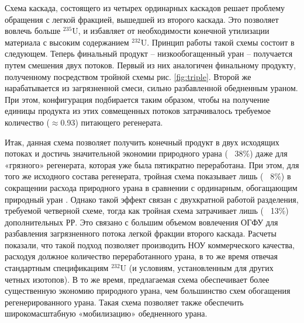 Схема каскада, состоящего из четырех ординарных каскадов решает проблему обращения с легкой фракцией, вышедшей из второго каскада.
Это позволяет вовлечь больше $^{235}$U, и избавляет от необходимости конечной утилизации материала с высоким содержанием $^{232}$U.
Принцип работы такой схемы состоит в следующем.
Теперь финальный продукт -- низкообогащенный уран -- получается путем смешения двух потоков.
Первый из них аналогичен финальному продукту, полученному посредством тройной схемы рис. \ref{fig:triple}.
Второй же нарабатывается из загрязненной смеси, сильно разбавленной обедненным ураном.
При этом, конфигурация подбирается таким образом, чтобы на получение единицы продукта из этих совмещенных потоков затрачивалось требуемое количество ($\approx$0.93) питающего регенерата.

Итак, данная схема позволяет получить конечный продукт в двух исходящих потоках и достичь значительной экономии природного урана (~ 38\%) даже для «грязного» регенерата, которая уже была пятикратно переработана.
При этом, для того же исходного состава регенерата, тройная схема показывает лишь (~ 8\%) в сокращении расхода природного урана в сравнении с ординарным, обогащающим природный уран \cite{smirnovObogashchenieRegenerirovannogoUrana2018}.
Однако такой эффект связан с двухкратной работой разделения, требуемой четверной схеме, тогда как тройная схема затрачивает лишь (~ 13\%) дополнительных РР.
Это связано с большим объемом вовлечения ОГФУ для разбавления загрязненного потока легкой фракции второго каскада.
Расчеты показали, что такой подход позволяет производить НОУ коммерческого качества, расходуя должное количество переработанного урана, в то же время отвечая стандартным спецификациям $^{232}$U (и условиям, установленным для других четных изотопов).
В то же время, предлагаемая схема обеспечивает более существенную экономию природного урана, чем большинство схем обогащения регенерированного урана.
Такая схема позволяет также обеспечить широкомасштабную «мобилизацию» обедненного урана.












